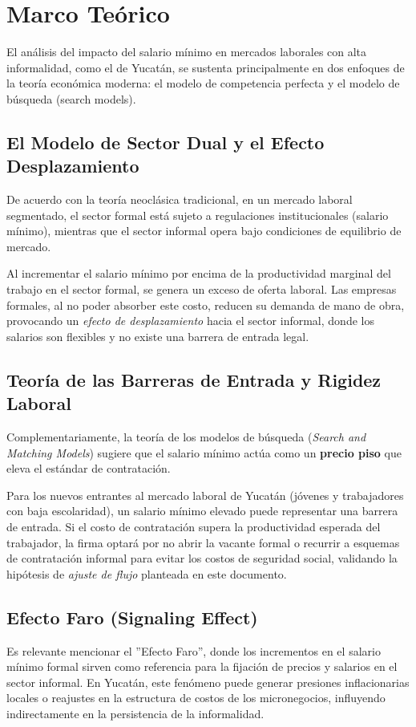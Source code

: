 \section{Marco Teórico}

El análisis del impacto del salario mínimo 
en mercados laborales con alta informalidad, 
como el de Yucatán, se sustenta principalmente 
en dos enfoques de la teoría económica moderna: 
el modelo de competencia perfecta y el modelo 
de búsqueda (search models).

\subsection{El Modelo de Sector Dual y el Efecto Desplazamiento}
De acuerdo con la teoría neoclásica tradicional, 
en un mercado laboral segmentado, el sector formal
está sujeto a regulaciones institucionales (salario mínimo), 
mientras que el sector informal opera bajo condiciones de equilibrio de mercado. 

Al incrementar el salario mínimo por encima de la 
productividad marginal del trabajo en el sector formal, 
se genera un exceso de oferta laboral. Las empresas 
formales, al no poder absorber este costo, reducen 
su demanda de mano de obra, provocando un 
\textit{efecto de desplazamiento} hacia el sector 
informal, donde los salarios son flexibles y no 
existe una barrera de entrada legal.

\subsection{Teoría de las Barreras de Entrada y Rigidez Laboral}
Complementariamente, la teoría de los modelos de 
búsqueda (\textit{Search and Matching Models}) sugiere 
que el salario mínimo actúa como un \textbf{precio piso} 
que eleva el estándar de contratación. 

Para los nuevos entrantes al mercado laboral de 
Yucatán (jóvenes y trabajadores con baja escolaridad), 
un salario mínimo elevado puede representar una barrera 
de entrada. Si el costo de contratación supera la 
productividad esperada del trabajador, la firma 
optará por no abrir la vacante formal o recurrir a 
esquemas de contratación informal para evitar los 
costos de seguridad social, validando la hipótesis 
de \textit{ajuste de flujo} planteada en este documento.

\subsection{Efecto Faro (Signaling Effect)}
Es relevante mencionar el ''Efecto Faro'', donde los 
incrementos en el salario mínimo formal sirven 
como referencia para la fijación de precios y 
salarios en el sector informal. En Yucatán, este 
fenómeno puede generar presiones inflacionarias 
locales o reajustes en la estructura de costos de 
los micronegocios, influyendo indirectamente en 
la persistencia de la informalidad.

